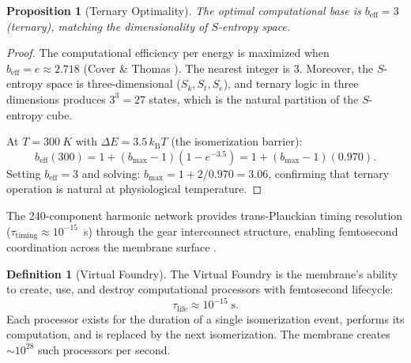 \documentclass[twocolumn,10pt]{article}
\newtheorem{proposition}[theorem]{Proposition}
\theoremstyle{definition}
\newtheorem{definition}[theorem]{Definition}
\theoremstyle{remark}
\newcommand{\Sk}{S_k}
\newcommand{\St}{S_t}
\newcommand{\Se}{S_e}
\newcommand{\kB}{k_{\mathrm{B}}}
\newcommand{\beff}{b_{\mathrm{eff}}}
\begin{document}
\begin{proposition}[Ternary Optimality]
\label{prop:ternary}
The optimal computational base is $\beff = 3$ (ternary), matching the dimensionality of $S$-entropy space.
\end{proposition}

\begin{proof}
The computational efficiency per energy is maximized when $\beff = e \approx 2.718$ (Cover \& Thomas \cite{cover2006elements}). The nearest integer is 3. Moreover, the $S$-entropy space is three-dimensional ($\Sk, \St, \Se$), and ternary logic in three dimensions produces $3^3 = 27$ states, which is the natural partition of the $S$-entropy cube.

At $T = \SI{300}{K}$ with $\Delta E = 3.5\,\kB T$ (the isomerization barrier):
\begin{equation}
  \beff(300) = 1 + (b_{\max} - 1)(1 - e^{-3.5}) = 1 + (b_{\max} - 1)(0.970).
  \label{eq:beff_300}
\end{equation}
Setting $\beff = 3$ and solving: $b_{\max} = 1 + 2/0.970 = 3.06$, confirming that ternary operation is natural at physiological temperature.
\end{proof}

The 240-component harmonic network provides trans-Planckian timing resolution ($\tau_{\mathrm{timing}} \approx 10^{-15}$~s) through the gear interconnect structure, enabling femtosecond coordination across the membrane surface \cite{sachikonye2026transplanckian}.

\begin{definition}[Virtual Foundry]
\label{def:foundry}
The Virtual Foundry is the membrane's ability to create, use, and destroy computational processors with femtosecond lifecycle:
\begin{equation}
  \tau_{\mathrm{life}} \approx 10^{-15}\;\mathrm{s}.
  \label{eq:tau_life}
\end{equation}
Each processor exists for the duration of a single isomerization event, performs its computation, and is replaced by the next isomerization. The membrane creates $\sim 10^{28}$ such processors per second.
\end{definition}
\end{document}
